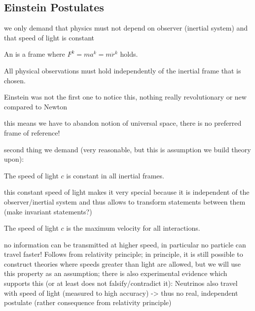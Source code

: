 		\subsection{Einstein Postulates}


we only demand that physics must not depend on observer (inertial system) and that speed of light is constant

\begin{defi}
An  is a frame where $F^k = m a^k = m \ddot{r}^k$ holds.
\end{defi}


\begin{post}
All physical observations must hold independently of the inertial frame that is chosen.
\end{post}
Einstein was not the first one to notice this, nothing really revolutionary or new compared to Newton

this means we have to abandon notion of universal space, there is no preferred frame of reference!



second thing we demand (very reasonable, but this is assumption we build theory upon):
\begin{post}[Relativity Principle]%
The speed of light $c$ is constant in all inertial frames.
\end{post}


this constant speed of light makes it very special because it is independent of the observer/inertial system and thus allows to transform statements between them (make invariant statements?)



\begin{prop}%
The speed of light $c$ is the maximum velocity for all interactions.
\end{prop}
no information can be transmitted at higher speed, in particular no particle can travel faster! Follows from relativity principle; in principle, it is still possible to construct theories where speeds greater than light are allowed, but we will use this property as an assumption; there is also experimental evidence which supports this (or at least does not falsify/contradict it): Neutrinos also travel with speed of light (measured to high accuracy) -> thus no real, independent postulate (rather consequence from relativity principle)





